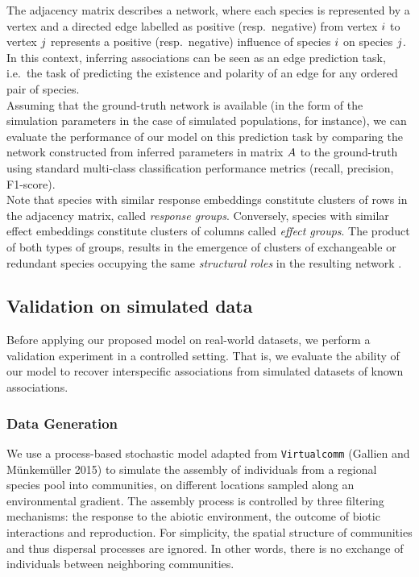 \documentclass[10pt,a4paper]{article}
\begin{document}
The adjacency matrix describes a network, where each species is represented by a vertex and a directed edge labelled as positive (resp.\ negative) from vertex $i$ to vertex $j$ represents a positive (resp.\ negative) influence of species $i$ on species $j$. In this context, inferring associations can be seen as an edge prediction task, i.e.\ the task of predicting the existence and polarity of an edge for any ordered pair of species.\\

Assuming that the ground-truth network is available (in the form of the simulation parameters in the case of simulated populations, for instance), we can evaluate the performance of our model on this prediction task by comparing the network constructed from inferred parameters in matrix $A$ to the ground-truth using standard multi-class classification performance metrics (recall, precision, F1-score).\\

Note that species with similar response embeddings constitute clusters of rows in the adjacency matrix, called \emph{response groups}. Conversely, species with similar effect embeddings constitute clusters of columns called \textit{effect groups}. The product of both types of groups, results in the emergence of clusters of exchangeable or redundant species occupying the same \emph{structural roles} in the resulting network \cite{gauzens2015trophic}. 

\subsection{Validation on simulated data}
Before applying our proposed model on real-world datasets, we perform a validation experiment in a controlled setting. That is, we evaluate the ability of our model to recover interspecific associations from simulated datasets of known associations.\\

\subsubsection{Data Generation}
We use a process-based stochastic model adapted from \texttt{Virtualcomm} (Gallien and Münkemüller 2015) to simulate the assembly of individuals from a regional species pool into communities, on different locations sampled along an environmental gradient. The assembly process is controlled by three filtering mechanisms: the response to the abiotic environment, the outcome of biotic interactions and reproduction.  For simplicity, the spatial structure of communities and thus dispersal processes are ignored. In other words, there is no exchange of individuals between neighboring communities.\\
\end{document}

